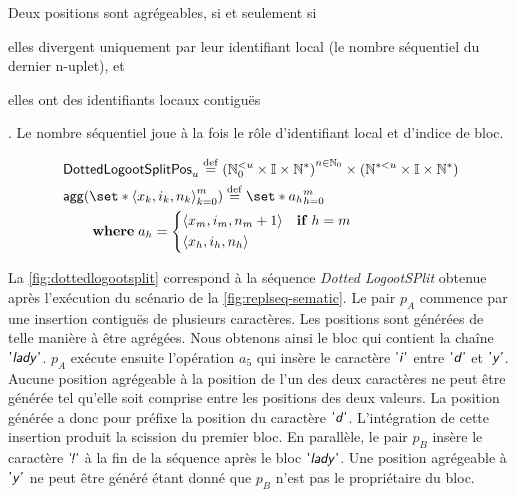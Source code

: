 Deux positions sont agrégeables, si et seulement si \begin{inlinelist}\item elles divergent uniquement par leur identifiant local (le nombre séquentiel du dernier n-uplet), et \item elles ont des identifiants locaux contiguës\end{inlinelist}.
Le nombre séquentiel joue à la fois le rôle d'identifiant local et d'indice de bloc.

\begin{align}
&\trm{DottedLogootSplitPos}_u \defeq {(\mathbb{N}_0^{< u} \times \mathbb{I} \times \mathbb{N}^*)}^{n \in \mathbb{N}_0} \times (\mathbb{N}^{* < u} \times \mathbb{I} \times \mathbb{N}^*)\\
&\begin{aligned}
    \MoveEqLeft \trm{agg}(\set*{\tuple*{x_k, i_k, n_k}}_{k=0}^m) \defeq \set*{a_h}_{h=0}^m\\
    &\where a_h = \begin{dcases}
        \tuple*{x_m, i_m, n_m + 1} & \when h = m\\
        \tuple*{x_h, i_h, n_h}
    \end{dcases}
\end{aligned}
\end{align}

La \autoref{fig:dottedlogootsplit} correspond à la séquence \emph{Dotted LogootSPlit} obtenue après l'exécution du scénario de la \autoref{fig:replseq-sematic}.
Le pair $p_A$ commence par une insertion contiguës de plusieurs caractères.
Les positions sont générées de telle manière à être agrégées.
Nous obtenons ainsi le bloc qui contient la chaîne $\textsf{'\textit{lady}'}$.
$p_A$ exécute ensuite l'opération $a_5$ qui insère le caractère $\textsf{'\textit{i}'}$ entre $\textsf{'\textit{d}'}$ et $\textsf{'\textit{y}'}$.
Aucune position agrégeable à la position de l'un des deux caractères ne peut être générée tel qu'elle soit comprise entre les positions des deux valeurs.
La position générée a donc pour préfixe la position du caractère $\textsf{'\textit{d}'}$.
L'intégration de cette insertion produit la scission du premier bloc.
En parallèle, le pair $p_B$ insère le caractère $\textsf{'\textit{\negthinspace!}'}$ à la fin de la séquence après le bloc $\textsf{'\textit{lady}'}$.
Une position agrégeable à $\textsf{'\textit{y}'}$ ne peut être généré étant donné que $p_B$ n'est pas le propriétaire du bloc.

